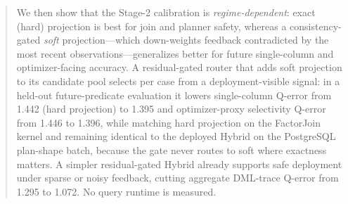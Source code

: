 \documentclass[preprint,12pt]{elsarticle}
\begin{document}
\begin{frontmatter}
\begin{abstract}
We then show that the Stage-2 calibration is \emph{regime-dependent}: exact
(hard) projection is best for join and planner safety, whereas a
consistency-gated \emph{soft} projection---which down-weights feedback
contradicted by the most recent observations---generalizes better for future
single-column and optimizer-facing accuracy. A residual-gated router that adds
soft projection to its candidate pool selects per case from a deployment-visible
signal: in a held-out future-predicate evaluation it lowers single-column
Q-error from 1.442 (hard projection) to 1.395 and optimizer-proxy selectivity
Q-error from 1.446 to 1.396, while matching hard projection on the FactorJoin
kernel and remaining identical to the deployed Hybrid on the PostgreSQL
plan-shape batch, because the gate never routes to soft where exactness matters. A simpler residual-gated Hybrid already
supports safe deployment under sparse or noisy feedback, cutting aggregate
DML-trace Q-error from 1.295 to 1.072. No query runtime is measured.
\end{abstract}

\begin{graphicalabstract}
\centering
{}
\end{graphicalabstract}


\end{frontmatter}
\end{document}
